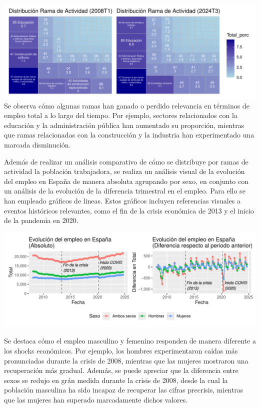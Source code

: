 \documentclass[Universitat de
València,article,submit,moreauthors,pdftex]{Definitions/mdpi}
\begin{document}
\includegraphics{ProyectoAED2024_files/figure-latex/unnamed-chunk-38-1.pdf}
Se observa cómo algunas ramas han ganado o perdido relevancia en
términos de empleo total a lo largo del tiempo. Por ejemplo, sectores
relacionados con la educación y la administración pública han aumentado
su proporción, mientras que ramas relacionadas con la construcción y la
industria han experimentado una marcada disminución.

Además de realizar un análisis comparativo de cómo se distribuye por
ramas de actividad la población trabajadora, se realiza un análisis
visual de la evolución del empleo en España de manera absoluta agrupando
por sexo, en conjunto con un análisis de la evolución de la diferencia
trimestral en el empleo. Para ello se han empleado gráficos de lineas.
Estos gráficos incluyen referencias visuales a eventos históricos
relevantes, como el fin de la crisis económica de 2013 y el inicio de la
pandemia en 2020.

\includegraphics{ProyectoAED2024_files/figure-latex/unnamed-chunk-39-1.pdf}

Se destaca cómo el empleo masculino y femenino responden de manera
diferente a los shocks económicos. Por ejemplo, los hombres
experimentaron caídas más pronunciadas durante la crisis de 2008,
mientras que las mujeres mostraron una recuperación más gradual. Además,
se puede apreciar que la diferencia entre sexos se redujo en grán medida
durante la crisis de 2008, desde la cual la población masculina ha sido
incapaz de recuperar las cifras precrisis, mientras que las mujeres han
superado marcadamente dichos valores.
\end{document}
